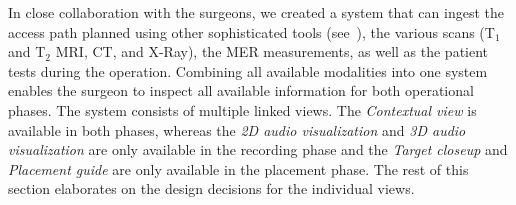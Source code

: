 In close collaboration with the surgeons, we created a system that can ingest the access path planned using other sophisticated tools (see~), the various scans (T$_1$ and T$_2$ MRI, CT, and X-Ray), the MER measurements, as well as the patient tests during the operation. Combining all available modalities into one system enables the surgeon to inspect all available information for both operational phases. The system consists of multiple linked views. The \emph{Contextual view} is available in both phases, whereas the \emph{2D audio visualization} and \emph{3D audio visualization} are only available in the recording phase and the \emph{Target closeup} and \emph{Placement guide} are only available in the placement phase. The rest of this section elaborates on the design decisions for the individual views.

